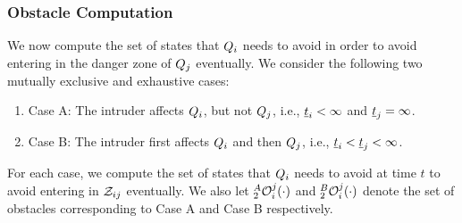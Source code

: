 \subsubsection{Obstacle Computation} \label{sec:intruderObs_case2}
We now compute the set of states that $Q_i$ needs to avoid in order to avoid entering in the danger zone of $Q_j$ eventually. We consider the following two mutually exclusive and exhaustive cases:
\begin{enumerate}
\item Case A: The intruder affects $Q_i$, but not $Q_j$, i.e., $\underline{t}_i < \infty$ and $\underline{t}_j = \infty$.
\item Case B: The intruder first affects $Q_i$ and then $Q_j$, i.e., $\underline{t}_i < \underline{t}_j < \infty$.
\end{enumerate}
For each case, we compute the set of states that $Q_i$ needs to avoid at time $t$ to avoid entering in $\mathcal{Z}_{ij}$ eventually. We also let $_2^A\mathcal{O}_i^j(\cdot)$ and $_2^B\mathcal{O}_i^j(\cdot)$ denote the set of obstacles corresponding to Case A and Case B respectively. 
